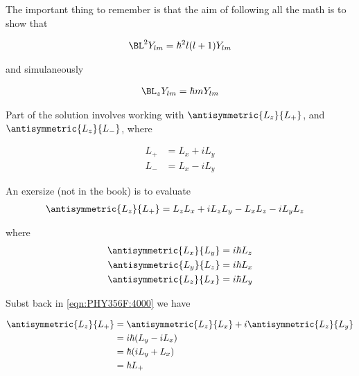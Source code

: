 The important thing to remember is that the aim of following all the math is to show that

\begin{align*}
\BL^2 Y_{lm} = \hbar^2 l (l+1) Y_{lm}
\end{align*}

and simulaneously 

\begin{align*}
\BL_z Y_{lm} = \hbar m Y_{lm}
\end{align*}

Part of the solution involves working with $\antisymmetric{L_z}{L_{+}}$, and $\antisymmetric{L_z}{L_{-}}$, where

\begin{align*}
L_{+} &= L_x + i L_y \\
L_{-} &= L_x - i L_y
\end{align*}

An exersize (not in the book) is to evaluate
\begin{align}\label{eqn:PHY356F:4000}
\antisymmetric{L_z}{L_{+}} 
&= L_z L_x + i L_z L_y - L_x L_z - i L_y L_z 
\end{align}

where
\begin{align}\label{eqn:PHY356F:5000}
\antisymmetric{L_x}{L_y}  &= i \hbar L_z \\
\antisymmetric{L_y}{L_z}  &= i \hbar L_x \\
\antisymmetric{L_z}{L_x}  &= i \hbar L_y
\end{align}

Subst back in \ref{eqn:PHY356F:4000} we have

\begin{align*}
\antisymmetric{L_z}{L_{+}} 
&=
\antisymmetric{L_z}{L_x} 
+ i \antisymmetric{L_z}{L_y}  \\
&=
i \hbar ( L_y - i L_x ) \\
&=
\hbar ( i L_y +  L_x ) \\
&=
\hbar L_{+}
\end{align*}

\EndNoBibArticle
